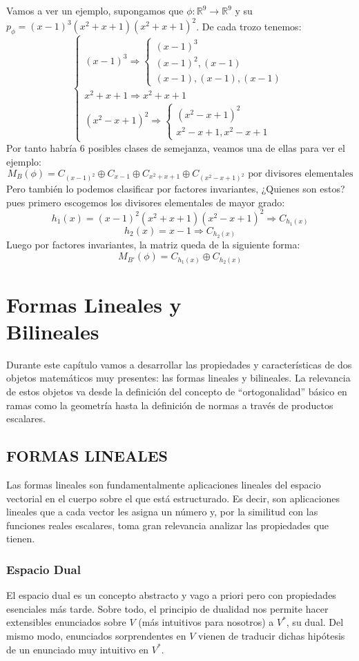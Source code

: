 \documentclass[10pt,a4paper,openright]{book}
\theoremstyle{break}
\begin{document}
Vamos a ver un ejemplo, supongamos que $\phi: \mathbb R^9\rightarrow \mathbb R^9$ y su $p_\phi= (x-1)^3(x^2+x+1)(x^2+x+1)^2$. De cada trozo tenemos:
$$\begin{cases}(x-1)^3 \Rightarrow \begin{cases} (x-1)^3 \\ (x-1)^2, (x-1) \\ (x-1), (x-1), (x-1) \end{cases} \\ x^2+x+1 \Rightarrow x^2+x+1\\ (x^2-x+1)^2\Rightarrow \begin{cases}(x^2-x+1)^2 \\ x^2-x+1, x^2-x+1 \end{cases}\end{cases}$$
Por tanto habría 6 posibles clases de semejanza, veamos una de ellas para ver el ejemplo:
$$M_B(\phi)=C_{(x-1)^2}\oplus C_{x-1}\oplus C_{x^2+x+1}\oplus C_{(x^2-x+1)^2}\mbox{	 por divisores elementales}$$
Pero también lo podemos clasificar por factores invariantes, ¿Quienes son estos? pues primero escogemos los divisores elementales de mayor grado:
$$h_1(x)=(x-1)^2(x^2+x+1)(x^2-x+1)^2\Rightarrow C_{h_1(x)}$$
$$h_2(x)=x-1\Rightarrow C_{h_2(x)}$$
Luego por factores invariantes, la matriz queda de la siguiente forma:
$$M_{B'}(\phi)=C_{h_1(x)}\oplus C_{h_2(x)}$$

\chapter{Formas Lineales y \\ Bilineales}
Durante este capítulo vamos a desarrollar las propiedades y características de dos objetos matemáticos muy presentes: las formas lineales y bilineales. La relevancia de estos objetos va desde la definición del concepto de ``ortogonalidad'' básico en ramas como la geometría hasta la definición de normas a través de productos escalares.

\section{FORMAS LINEALES}
Las formas lineales son fundamentalmente aplicaciones lineales del espacio vectorial en el cuerpo sobre el que está estructurado. Es decir, son aplicaciones lineales que a cada vector les asigna un número y, por la similitud con las funciones reales escalares, toma gran relevancia analizar las propiedades que tienen.

\subsection{Espacio Dual}
El espacio dual es un concepto abstracto y vago a priori pero con propiedades esenciales más tarde. Sobre todo, el principio de dualidad nos permite hacer extensibles enunciados sobre $V$ (más intuitivos para nosotros) a $V^*$, su dual. Del mismo modo, enunciados sorprendentes en $V$ vienen de traducir dichas hipótesis de un enunciado muy intuitivo en $V^*$.
\end{document}
